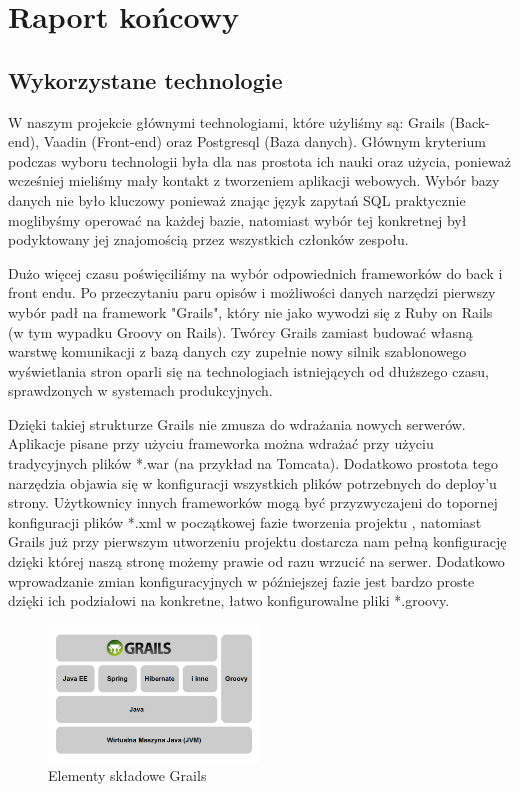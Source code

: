 \chapter{Raport końcowy}
\label{cha:raport}

\section{Wykorzystane technologie}
\label{sec:technologie}

W naszym projekcie głównymi technologiami, które użyliśmy są: Grails (Back-end), Vaadin (Front-end) oraz Postgresql (Baza danych). Głównym kryterium podczas wyboru technologii była dla nas prostota ich nauki oraz użycia, ponieważ wcześniej mieliśmy mały kontakt z tworzeniem aplikacji webowych. Wybór bazy danych nie było kluczowy ponieważ znając język zapytań SQL praktycznie moglibyśmy operować na każdej bazie, natomiast wybór tej konkretnej był podyktowany jej znajomością przez wszystkich członków zespołu. 

Dużo więcej czasu poświęciliśmy na wybór odpowiednich frameworków do back i front endu. Po przeczytaniu paru opisów i możliwości danych narzędzi pierwszy wybór padł na framework "Grails", który nie jako wywodzi się z Ruby on Rails (w tym wypadku Groovy on Rails). Twórcy Grails zamiast budować własną warstwę komunikacji z bazą danych czy zupełnie nowy silnik szablonowego wyświetlania stron oparli się na technologiach istniejących od dłuższego czasu, sprawdzonych w systemach produkcyjnych. 

Dzięki takiej strukturze Grails nie zmusza do wdrażania nowych serwerów. Aplikacje pisane przy użyciu frameworka można wdrażać przy użyciu tradycyjnych plików *.war (na przykład na Tomcata). Dodatkowo prostota tego narzędzia objawia się w konfiguracji wszystkich plików potrzebnych do deploy'u strony. Użytkownicy innych frameworków mogą być przyzwyczajeni do topornej konfiguracji plików *.xml w początkowej fazie tworzenia projektu , natomiast Grails już przy pierwszym utworzeniu projektu dostarcza nam pełną konfigurację dzięki której naszą stronę możemy prawie od razu wrzucić na serwer. Dodatkowo wprowadzanie zmian konfiguracyjnych w późniejszej fazie jest bardzo proste dzięki ich podziałowi na konkretne, łatwo konfigurowalne pliki *.groovy. 

\begin{figure}[h!]
\centering
\includegraphics[width=0.5\textwidth]{./img/grails_stack}
\caption{Elementy składowe Grails}
\label{fig:grails-stack}
\end{figure}

